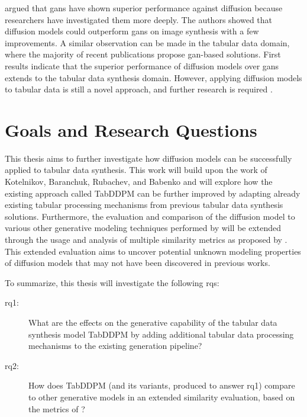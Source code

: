 \textcite{dhariwal2021DiffusionModelsBeat} argued that \glspl{gan} have shown superior performance against diffusion because researchers have investigated them more deeply.
The authors showed that diffusion models could outperform \glspl{gan} on image synthesis with a few improvements.
A similar observation can be made in the tabular data domain, where the majority of recent publications propose \gls{gan}-based solutions.
First results \cite{kotelnikov2022TabDDPMModellingTabular} indicate that the superior performance of diffusion models over \glspl{gan} extends to the tabular data synthesis domain.
However, applying diffusion models to tabular data is still a novel approach, and further research is required \cite{borisov2022DeepNeuralNetworks}.


\section{Goals and Research Questions}
\label{ch:intro-goals}
This thesis aims to further investigate how diffusion models can be successfully applied to tabular data synthesis.
This work will build upon the work of Kotelnikov, Baranchuk, Rubachev, and Babenko \cite{kotelnikov2022TabDDPMModellingTabular} and will explore how the existing approach called TabDDPM can be further improved by adapting
already existing tabular processing mechanisms from previous tabular data synthesis solutions.
Furthermore, the evaluation and comparison of the diffusion \gls{model} to various other generative modeling techniques performed by \textcite{kotelnikov2022TabDDPMModellingTabular} will be extended through the usage and analysis
of multiple similarity metrics as proposed by \textcite{chundawat2022UniversalMetricRobust}.
This extended evaluation aims to uncover potential unknown modeling properties of diffusion models that may not have been discovered in previous works.

To summarize, this thesis will investigate the following \glspl{rq}:

\begin{description}
	\item[\gls{rq}1:] What are the effects on the generative capability of the tabular data synthesis \gls{model} TabDDPM by adding additional tabular data processing mechanisms to the existing generation pipeline?
	\item[\gls{rq}2:] How does TabDDPM (and its variants, produced to answer \gls{rq}1) compare to other generative models in an extended similarity evaluation, based on the metrics of \textcite{chundawat2022UniversalMetricRobust}?
\end{description}

